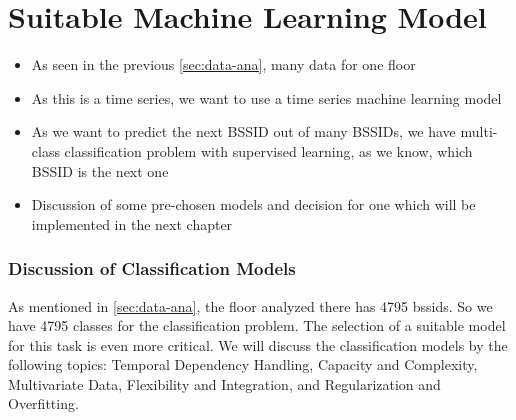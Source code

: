 \chapter{Suitable Machine Learning Model}\label{sec:discuss-ml}


\begin{itemize}
    \item As seen in the previous \cref{sec:data-ana}, many data for one floor 
    \item As this is a time series, we want to use a time series machine learning model
    \item As we want to predict the next BSSID out of many BSSIDs, we have multi-class classification problem with supervised learning, as we know, which BSSID is the next one
    \item Discussion of some pre-chosen models and decision for one which will be implemented in the next chapter
\end{itemize}



\subsection{Discussion of Classification Models}
As mentioned in \cref{sec:data-ana}, the floor analyzed there has 4795 \acp{bssid}.
So we have 4795 classes for the classification problem.
The selection of a suitable model for this task is even more critical.
We will discuss the classification models by the following topics: Temporal Dependency Handling, Capacity and Complexity, Multivariate Data, Flexibility and Integration, and Regularization and Overfitting. \\

